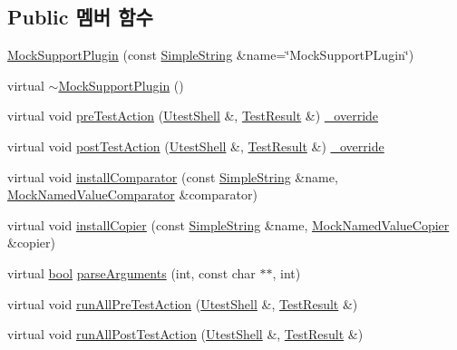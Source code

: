 \subsection*{Public 멤버 함수}
\begin{DoxyCompactItemize}
\item 
\hyperlink{class_mock_support_plugin_aabcedc06992a9c442d8c21e6ca3c2c68}{Mock\+Support\+Plugin} (const \hyperlink{class_simple_string}{Simple\+String} \&name=\char`\"{}Mock\+Support\+P\+Lugin\char`\"{})
\item 
virtual \hyperlink{class_mock_support_plugin_a2ba62bad442cbfb7adca312072d5edbd}{$\sim$\+Mock\+Support\+Plugin} ()
\item 
virtual void \hyperlink{class_mock_support_plugin_a54fdb63116ef1d06875bd8987dff332c}{pre\+Test\+Action} (\hyperlink{class_utest_shell}{Utest\+Shell} \&, \hyperlink{class_test_result}{Test\+Result} \&) \hyperlink{_cpp_u_test_config_8h_a049bea15dd750e15869863c94c1efc3b}{\+\_\+override}
\item 
virtual void \hyperlink{class_mock_support_plugin_adf78fc781aec60bcc39d3ffd8f32b57b}{post\+Test\+Action} (\hyperlink{class_utest_shell}{Utest\+Shell} \&, \hyperlink{class_test_result}{Test\+Result} \&) \hyperlink{_cpp_u_test_config_8h_a049bea15dd750e15869863c94c1efc3b}{\+\_\+override}
\item 
virtual void \hyperlink{class_mock_support_plugin_a6a92283ccd382316f4e3f84ed4c7fa1b}{install\+Comparator} (const \hyperlink{class_simple_string}{Simple\+String} \&name, \hyperlink{class_mock_named_value_comparator}{Mock\+Named\+Value\+Comparator} \&comparator)
\item 
virtual void \hyperlink{class_mock_support_plugin_a558aef2ec4dc86ff685a8e3cf9e86441}{install\+Copier} (const \hyperlink{class_simple_string}{Simple\+String} \&name, \hyperlink{class_mock_named_value_copier}{Mock\+Named\+Value\+Copier} \&copier)
\item 
virtual \hyperlink{avb__gptp_8h_af6a258d8f3ee5206d682d799316314b1}{bool} \hyperlink{class_test_plugin_a167c2b07a0f83726bb9b1d1c0d741f88}{parse\+Arguments} (int, const char $\ast$$\ast$, int)
\item 
virtual void \hyperlink{class_test_plugin_aa3524b10b0f1613104fa75f1c1a72cf6}{run\+All\+Pre\+Test\+Action} (\hyperlink{class_utest_shell}{Utest\+Shell} \&, \hyperlink{class_test_result}{Test\+Result} \&)
\item 
virtual void \hyperlink{class_test_plugin_ac6e93f69beb5b43b8cedf17a77ccc6b1}{run\+All\+Post\+Test\+Action} (\hyperlink{class_utest_shell}{Utest\+Shell} \&, \hyperlink{class_test_result}{Test\+Result} \&)
$$
\end{DoxyCompactItemize}
